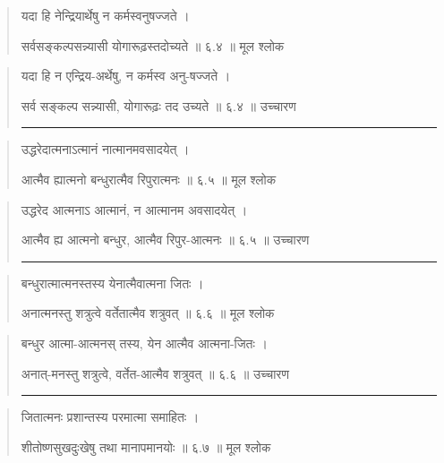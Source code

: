\begin{quotation}  

यदा हि नेन्द्रियार्थेषु न कर्मस्वनुषज्जते  ।  

सर्वसङ्‍कल्पसन्न्यासी योगारूढ़स्तदोच्यते  ॥ ६.४ ॥  मूल श्लोक
\end{quotation}

\begin{quotation}

यदा हि न एन्द्रिय-अर्थेषु, न कर्मस्व अनु-षज्जते  ।  

सर्व सङ्‍कल्प सन्न्यासी, योगारूढ़ः तद उच्यते  ॥ ६.४ ॥  उच्चारण

\noindent\rule{16cm}{0.4pt} 
\end{quotation}


\begin{quotation}  

उद्धरेदात्मनाऽत्मानं नात्मानमवसादयेत्‌  ।  

आत्मैव ह्यात्मनो बन्धुरात्मैव रिपुरात्मनः  ॥ ६.५ ॥  मूल श्लोक
\end{quotation}

\begin{quotation}

उद्धरेद आत्मनाऽ आत्मानं, न आत्मानम अवसादयेत्‌  ।  

आत्मैव ह्य आत्मनो बन्धुर, आत्मैव रिपुर-आत्मनः  ॥ ६.५ ॥  उच्चारण

\noindent\rule{16cm}{0.4pt} 
\end{quotation}


\begin{quotation}  
बन्धुरात्मात्मनस्तस्य येनात्मैवात्मना जितः  ।  

अनात्मनस्तु शत्रुत्वे वर्तेतात्मैव शत्रुवत्‌  ॥ ६.६ ॥  मूल श्लोक
\end{quotation}

\begin{quotation}

बन्धुर आत्मा-आत्मनस् तस्य, येन आत्मैव आत्मना-जितः  ।  

अनात्-मनस्तु शत्रुत्वे, वर्तेत-आत्मैव शत्रुवत्‌  ॥ ६.६ ॥  उच्चारण

\noindent\rule{16cm}{0.4pt} 
\end{quotation}


\begin{quotation}  

जितात्मनः प्रशान्तस्य परमात्मा समाहितः  ।  

शीतोष्णसुखदुःखेषु तथा मानापमानयोः  ॥ ६.७ ॥  मूल श्लोक
\end{quotation}

